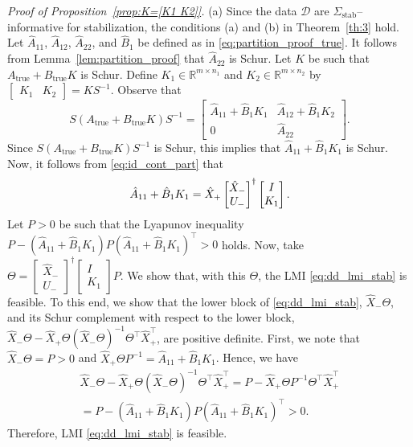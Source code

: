 \documentclass[9pt,shortpaper,twoside,web]{ieeecolor}
\begin{document}
\textit{Proof of Proposition~\ref{prop:K=[K1 K2]}.} (a) Since the data $\mathcal{D}$ are \mbox{$\Sigma_\text{stab}$--informative} for stabilization, the conditions (a) and (b) in Theorem~\ref{th:3} hold. Let $\hat{A}_{11}$, $\hat{A}_{12}$, $\hat{A}_{22}$, and $\hat{B}_1$ be defined as in \eqref{eq:partition_proof_true}. It follows from Lemma~\ref{lem:partition_proof} that $\hat{A}_{22}$ is Schur. Let $K$ be such that \mbox{$A_\text{true}+B_\text{true}K$} is Schur. Define $K_1\in\mathbb{R}^{m\times n_1}$ and $K_2\in\mathbb{R}^{m\times n_2}$ by \mbox{$\begin{bmatrix}
K_1 & K_2
\end{bmatrix}=KS^{-1}$}. Observe that
\begin{equation}
S(A_\text{true}+B_\text{true}K)S^{-1}=\begin{bmatrix}
\hat{A}_{11}+\hat{B}_1K_1 & \hat{A}_{12}+\hat{B}_1K_2 \\
0 & \hat{A}_{22}
\end{bmatrix}.
\end{equation}
Since $S(A_\text{true}+B_\text{true}K)S^{-1}$ is Schur, this implies that $\hat{A}_{11}+\hat{B}_1K_1$ is Schur. Now, it follows from \eqref{eq:id_cont_part} that
\begin{equation}
\label{eq:A_{11}+B_1K_1}
\hat{A}_{11}+\hat{B}_1K_1=\hat{X}_+\begin{bmatrix}
\hat{X}_- \\
U_-
\end{bmatrix}^\dagger\begin{bmatrix}
I \\ K_1
\end{bmatrix}.
\end{equation}
Let $P>0$ be such that the Lyapunov inequality \mbox{$P-(\hat{A}_{11}+\hat{B}_1K_1)P(\hat{A}_{11}+\hat{B}_1K_1)^\top>0$} holds. Now, take $\Theta=\begin{bmatrix}
\hat{X}_- \\
U_-
\end{bmatrix}^\dagger\begin{bmatrix}
I \\ K_1
\end{bmatrix}P$.
We show that, with this $\Theta$, the LMI \eqref{eq:dd_lmi_stab} is feasible. To this end, we show that the lower block of \eqref{eq:dd_lmi_stab}, $\hat{X}_-\Theta$, and its Schur complement with respect to the lower block, $\hat{X}_-\Theta-\hat{X}_+\Theta(\hat{X}_-\Theta)^{-1}\Theta^\top \hat{X}_+^\top$, are positive definite. First, we note that $\hat{X}_-\Theta=P>0$ and $\hat{X}_+\Theta P^{-1}=\hat{A}_{11}+\hat{B}_1K_1$. Hence, we have
\begin{equation}
\begin{split}
\hat{X}_-\Theta-\hat{X}_+\Theta(\hat{X}_-\Theta)^{-1}\Theta^\top \hat{X}_+^\top=
P-\hat{X}_+\Theta P^{-1}\Theta^\top \hat{X}_+^\top \\
=P-(\hat{A}_{11}+\hat{B}_1K_1)P(\hat{A}_{11}+\hat{B}_1K_1)^\top>0.
\end{split}
\end{equation}
Therefore, LMI \eqref{eq:dd_lmi_stab} is feasible. 
\end{document}
